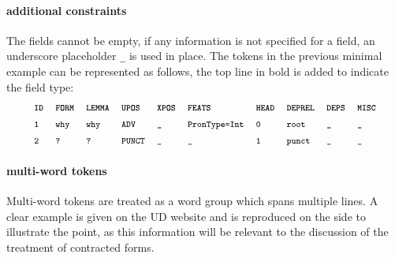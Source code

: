 \paragraph{additional constraints} The fields cannot be empty, if any information  is not specified for a field, an underscore placeholder \texttt{\_} is used in place.
The tokens in the previous minimal example can be represented as follows, the top line in bold is added to indicate the field type:
\begin{align*}
\conllu{\textbf{ID}}\tab\conllu{\textbf{FORM}}\tab\conllu{\textbf{LEMMA}}\tab\conllu{\textbf{UPOS}}\tab\conllu{\textbf{XPOS}}\tab\conllu{\textbf{FEATS}}\tab\conllu{\textbf{HEAD}}\tab\conllu{\textbf{DEPREL}}\tab\conllu{\textbf{DEPS}}\tab\conllu{\textbf{MISC}}\\
\conllu{1}\tab\conllu{why}\tab\conllu{why}\tab\conllu{ADV}\tab\conllu{\_}\tab\conllu{PronType=Int}\tab\conllu{0}\tab\conllu{root}\tab\conllu{\_}\tab\conllu{\_}\\
\conllu{2}\tab\conllu{?}\tab\conllu{?}\tab\conllu{PUNCT}\tab\conllu{\_}\tab\conllu{\_}\tab\conllu{1}\tab\conllu{punct}\tab\conllu{\_}\tab\conllu{\_}
\end{align*}

\paragraph{multi-word tokens}
Multi-word tokens are treated as a word group which spans multiple lines. A clear example is given on the UD website  and is reproduced on the side to illustrate the point, as this information will be relevant to the discussion of the treatment of contracted forms.


